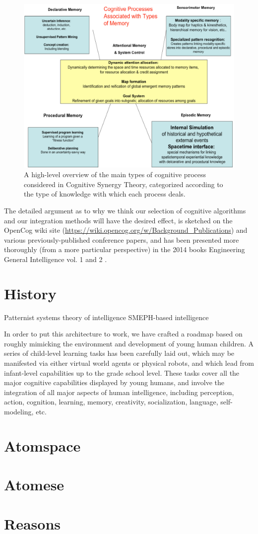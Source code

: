 \begin{figure}
\centering
\includegraphics[width=0.7
\textwidth]{figures/Magistrale/04 - cognitive_processes_and_memory}
\caption[Cognitive Processes.]{A high-level overview of the main types of cognitive process considered in Cognitive Synergy Theory, categorized according to the type of knowledge with which each process deals.
\label{fig:cognitive_processes}}
\end{figure} 

The detailed argument as to why we think our selection of cognitive algorithms and our integration methods will have the desired effect, is sketched on the OpenCog wiki site (\footnotesize{\url{https://wiki.opencog.org/w/Background_Publications}}\normalsize) and various previously-published conference papers, and has been presented more thoroughly (from a more particular perspective) in the 2014 books Engineering General Intelligence vol. 1 and 2 \cite{DBLP:series/atlantis/GoertzelPG14, DBLP:series/atlantis/GoertzelPG14a}.


\section{History}\label{sec:history}

Patternist systems theory of intelligence SMEPH-based intelligence \cite{inproceedings_SMEPH}

In order to put this architecture to work, we have crafted a roadmap based on roughly mimicking the environment and development of young human children. A series of child-level learning tasks has been carefully laid out, which may be manifested via either virtual world agents or physical robots, and which lead from infant-level capabilities up to the grade school level. These tasks cover all the major cognitive capabilities displayed by young humans, and involve the integration of all major aspects of human intelligence, including perception, action, cognition, learning, memory, creativity, socialization, language, self-modeling, etc.

\cite{DBLP:series/atlantis/Rohde10}

\section{Atomspace}\label{sec:atomspace}


\section{Atomese}\label{sec:atomese}


\section{Reasons}\label{sec:reasons}